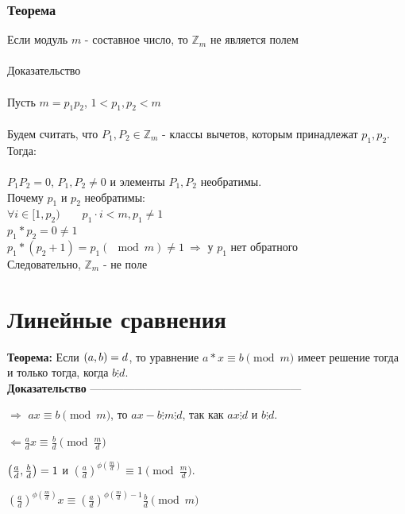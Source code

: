 \documentclass[12pt]{article}
\let\gcd\relax
\DeclareMathOperator{\gcd}{НОД}
\begin{document}
\subsubsection{Теорема}
Если модуль $m$ - составное число, то $\mathbb{Z}_m$ не является полем\\
\\
Доказательство\\
\\
Пусть \quad $m = p_1p_2$, \qquad $1 < p_1, p_2 < m$\\
\\
Будем считать, что $P_1, P_2 \in \mathbb{Z}_m$ - классы вычетов, которым принадлежат $p_1, p_2$. Тогда:\\
\\
\quad $P_1P_2 = 0$, \quad $P_1, P_2 \ne 0$ \quad и элементы $P_1, P_2$ необратимы.\\
Почему $p_1$ и $p_2$ необратимы:\\
$\forall i \in [1, p_2) \qquad p_1 \cdot i < m, p_1 \neq 1$ \\
$p_1 * p_2 = 0 \neq 1$\\
$p_1 * (p_2 + 1) = p_1 (\mod m) \neq 1\ \Rightarrow$ у $p_1$ нет обратного \\
Следовательно, $\mathbb{Z}_m$ - не поле

\section{Линейные сравнения}
\textbf{Теорема:}
Если $\gcd(a, b) = d$, то уравнение $a*x\equiv b \pmod{m}$ имеет решение тогда и только тогда, когда $b \vdots d$.\\
\textbf{Доказательство} ---------------------------------------------------------

\vspace{0.3cm} %

$\Rightarrow$ $ax \equiv b \pmod{m}$, то $ax - b \vdots m \vdots d$, так как $ax \vdots d$ и $b \vdots d$.

$\Leftarrow$$\frac{a}{d}x \equiv \frac{b}{d} \pmod{\frac{m}{d}}$

$\gcd\left(\frac{a}{d}, \frac{b}{d}\right) = 1$ и $\left(\frac{a}{d}\right)^{\phi\left(\frac{m}{d}\right)} \equiv 1 \pmod{\frac{m}{d}}$.

    \vspace{0.5cm} %
$\left(\frac{a}{d}\right)^{\phi\left(\frac{m}{d}\right)} x \equiv \left(\frac{a}{d}\right)^{\phi\left(\frac{m}{d}\right) - 1} \frac{b}{d} \pmod{m}$
\end{document}
